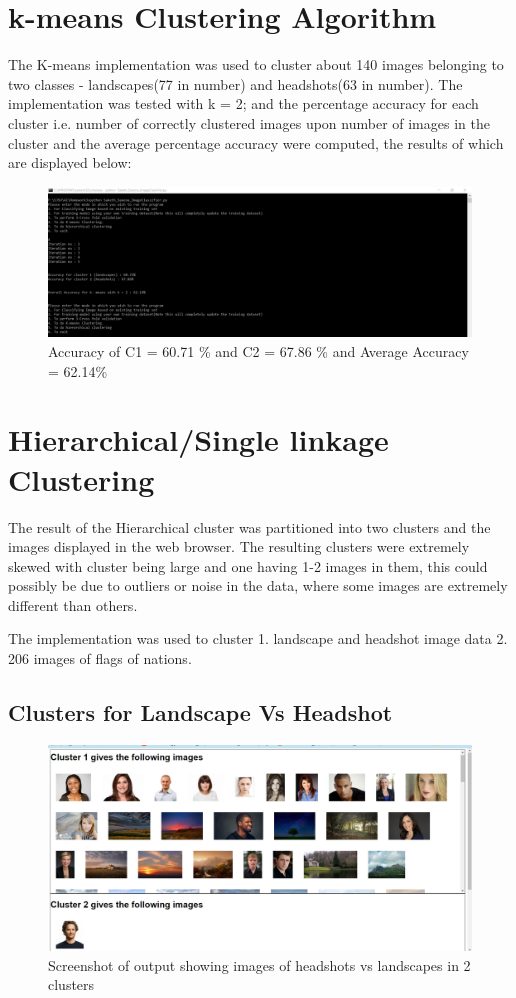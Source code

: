 \documentclass[a4paper]{article}
\begin{document}
\section{k-means Clustering Algorithm}
The K-means implementation was used to cluster about 140 images belonging to two classes - landscapes(77 in number) and headshots(63 in number).
The implementation was tested with k = 2; and the percentage accuracy for each cluster i.e. number of correctly clustered images upon number of images in the cluster and the average percentage accuracy were computed, the results of which are displayed below:
\begin{figure}[H]
  \includegraphics[width=\linewidth]{k_means_result.PNG}
  \caption{Accuracy of C1 = 60.71 \% and C2 = 67.86 \% and Average Accuracy = 62.14\% }
  \label{fig:Result 1}
\end{figure}


\section{Hierarchical/Single linkage Clustering}
The result of the Hierarchical cluster was partitioned into two clusters and the images displayed in the web browser.
The resulting clusters were extremely skewed with cluster being large and one having 1-2 images in them, this could possibly be due to outliers or noise in the data, where some images are extremely different than others.

The implementation was used to cluster 1. landscape and headshot image data 2. 206 images of flags of nations.

\subsection{Clusters for Landscape Vs Headshot}
\begin{figure}[H]
\centering
\includegraphics[width=1\textwidth]{head_land.PNG}
\caption{Screenshot of output showing images of headshots vs landscapes in 2 clusters}\label{}
\end{figure}
\end{document}
